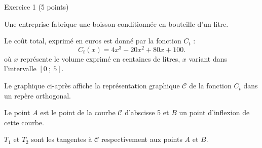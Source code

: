 
%
\begin{h2}Exercice 1 (5 points)\end{h2}
\par
Une entreprise fabrique une boisson conditionnée en bouteille d'un litre.
\par
Le coût total, exprimé en euros est donné par la fonction $C_t$ :
\[ C_t(x)=4x^3-20x^2+80x+100. \]
où $x$ représente le volume exprimé en centaines de litres, $x$ variant dans l'intervalle $[0~;~5]$.
\par
Le graphique ci-après affiche la représentation graphique $\mathscr{C}$ de la fonction $C_t$ dans un repère orthogonal.
\par
Le point $A$ est le point de la courbe $\mathscr{C}$ d'abscisse 5 et $B$ un point d'inflexion de cette courbe.
\par
$T_1$ et $T_2$ sont les tangentes à $\mathscr{C}$ respectivement aux points $A$ et $B$.
\par



